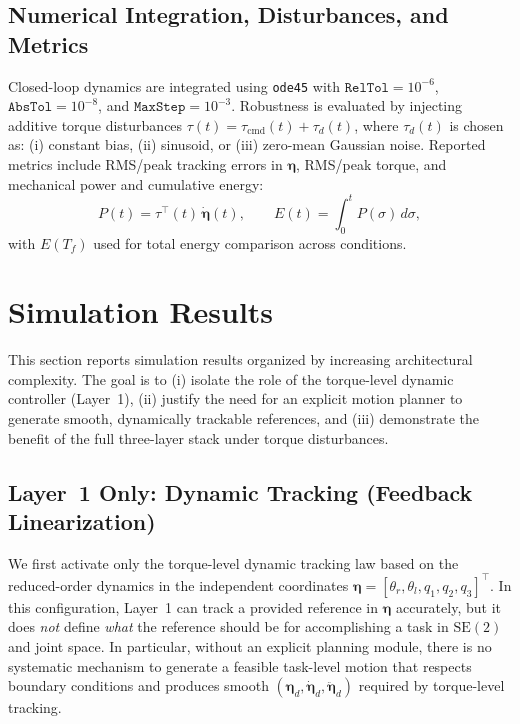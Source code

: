 \documentclass[conference]{IEEEtran}
\newcommand{\etav}{\bm{\eta}}
\newcommand{\etavdot}{\dot{\bm{\eta}}}
\newcommand{\etavddot}{\ddot{\bm{\eta}}}
\begin{document}
\subsection{Numerical Integration, Disturbances, and Metrics}
Closed-loop dynamics are integrated using \texttt{ode45} with
$\texttt{RelTol}=10^{-6}$, $\texttt{AbsTol}=10^{-8}$, and $\texttt{MaxStep}=10^{-3}$.
Robustness is evaluated by injecting additive torque disturbances
$\tau(t)=\tau_{\mathrm{cmd}}(t)+\tau_d(t)$, where $\tau_d(t)$ is chosen as:
(i) constant bias, (ii) sinusoid, or (iii) zero-mean Gaussian noise.
Reported metrics include RMS/peak tracking errors in $\bm{\eta}$, RMS/peak torque, and mechanical power and
cumulative energy:
\[
P(t)=\tau^{\top}(t)\,\dot{\bm{\eta}}(t),\qquad
E(t)=\int_{0}^{t} P(\sigma)\,d\sigma,
\]
with $E(T_f)$ used for total energy comparison across conditions.

\section{Simulation Results}
\label{sec:sim_results}

This section reports simulation results organized by increasing architectural
complexity. The goal is to (i) isolate the role of the torque-level dynamic
controller (Layer~1), (ii) justify the need for an explicit motion planner to
generate smooth, dynamically trackable references, and (iii) demonstrate the
benefit of the full three-layer stack under torque disturbances.

\subsection{Layer~1 Only: Dynamic Tracking (Feedback Linearization)}
\label{subsec:res_layer1_only}
We first activate only the torque-level dynamic tracking law based on the
reduced-order dynamics in the independent coordinates
$\etav=[\theta_r,\theta_l,q_1,q_2,q_3]^\top$.
In this configuration, Layer~1 can track a provided reference in $\etav$
accurately, but it does \emph{not} define \emph{what} the reference should be
for accomplishing a task in $\mathrm{SE}(2)$ and joint space. In particular,
without an explicit planning module, there is no systematic mechanism to
generate a feasible task-level motion that respects boundary conditions and
produces smooth $(\etav_d,\etavdot_d,\etavddot_d)$ required by torque-level
tracking.
\end{document}

